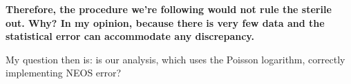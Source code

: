 \documentclass[a4paper, 10 pt]{article}
\begin{document}
{\bfseries Therefore, the procedure we're following would not rule the sterile out. Why? In my opinion, because there is very few data and the statistical error can accommodate any discrepancy. }

My question then is: is our analysis, which uses the Poisson logarithm, correctly implementing NEOS error? 
\end{document}
